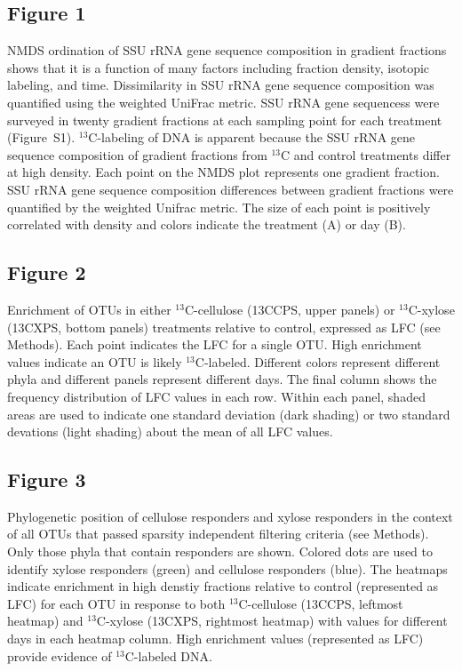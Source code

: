 \subsection{Figure 1}
NMDS ordination of SSU rRNA gene sequence composition in
gradient fractions shows that it is
a function of many factors including fraction density, isotopic labeling, and
time. Dissimilarity in SSU rRNA gene sequence composition was quantified using the 
weighted UniFrac metric. SSU rRNA gene sequencess were surveyed in twenty
gradient fractions at each sampling point for each treatment (Figure~S1).
$^{13}$C-labeling of DNA is apparent because the SSU rRNA gene sequence composition of
gradient fractions from $^{13}$C and control treatments differ at high density.
Each point on the NMDS plot represents one gradient fraction.  SSU rRNA gene sequence
composition differences between gradient fractions were quantified by the
weighted Unifrac metric. The size of each point is positively correlated with
density and colors indicate the treatment (A) or day (B).
\subsection{Figure 2}
Enrichment of OTUs in either $^{13}$C-cellulose (13CCPS, upper panels) or $^{13}$C-xylose (13CXPS, bottom panels) 
treatments relative to control, expressed as LFC (see Methods). Each point indicates the LFC for a single OTU. High
enrichment values indicate an OTU is likely $^{13}$C-labeled. Different colors
represent different phyla and different panels represent different days. The
final column shows the frequency distribution of LFC values in each row. Within
each panel, shaded areas are used to indicate one standard
deviation (dark shading) or two standard devations (light shading) about the
mean of all LFC values.
\subsection{Figure 3}
Phylogenetic position of cellulose responders and xylose responders in the context of all OTUs that passed 
sparsity independent filtering criteria (see Methods). Only those phyla that contain responders are shown.
Colored dots are used to identify xylose responders (green) and cellulose
responders (blue). The heatmaps indicate enrichment in high denstiy fractions
relative to control (represented as LFC) for each OTU in response to both
$^{13}$C-cellulose (13CCPS, leftmost heatmap) and $^{13}$C-xylose
(13CXPS, rightmost heatmap) with values for different days in each heatmap
column. High enrichment values (represented as LFC) provide evidence of $^{13}$C-labeled DNA.  

